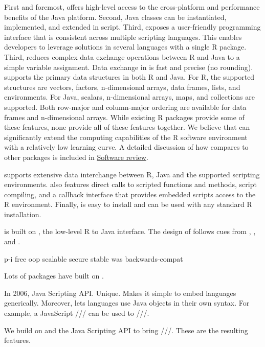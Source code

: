  First and foremost,  offers high-level access to the cross-platform and performance benefits of the Java platform. Second, Java classes can be instantiated, implemented, and extended in script. Third,  exposes a user-friendly programming interface that is consistent across multiple scripting languages. This enables developers to leverage solutions in several languages with a single R package. Third,  reduces complex data exchange operations between R and Java to a simple variable assignment. Data exchange in  is fast and precise (no rounding).  supports the primary data structures in both R and Java. For R, the supported structures are vectors, factors, n-dimensional arrays, data frames, lists, and environments. For Java, scalars, n-dimensional arrays, maps, and collections are supported. Both row-major and column-major ordering are available for data frames and n-dimensional arrays. While existing R packages provide some of these features, none provide all of these features together. We believe that  can significantly extend the computing capabilities of the R software environment with a relatively low learning curve. A detailed discussion of how  compares to other packages is included in \hyperlink{softwarereview}{Software review}.



 supports extensive data interchange between R, Java and the supported scripting environments.  also features direct calls to scripted functions and methods, script compiling, and a callback interface that provides embedded scripts access to the R environment. Finally,  is easy to install and can be used with any standard R installation.


 is built on  \citep{rjava}, the low-level R to Java interface. The design of  follows cues from ,  \citep{rscala}, and  \citep{v8pkg}.



p-i
free
oop
scalable
secure
stable
was backwards-compat

Lots of packages have built on .

In 2006, Java Scripting API. Unique. Makes it simple to embed languages generically. Moreover, lets languages use Java objects in their own syntax. For example, a JavaScript /// can be used to ///.

We build on  and the Java Scripting API to bring ///. These are the resulting features.

